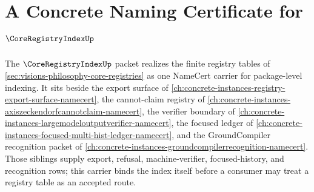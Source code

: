 \chapter{A Concrete Naming Certificate for $\CoreRegistryIndexUp$}
\label{ch:concrete-instances-core-registry-index-namecert}

The $\CoreRegistryIndexUp$ packet realizes the finite registry tables of \autoref{sec:visions-philosophy-core-registries} as one NameCert carrier for package-level indexing. It sits beside the export surface of \autoref{ch:concrete-instances-registry-export-surface-namecert}, the cannot-claim registry of \autoref{ch:concrete-instances-axiszeckendorfcannotclaim-namecert}, the verifier boundary of \autoref{ch:concrete-instances-largemodeloutputverifier-namecert}, the focused ledger of \autoref{ch:concrete-instances-focused-multi-hist-ledger-namecert}, and the GroundCompiler recognition packet of \autoref{ch:concrete-instances-groundcompilerrecognition-namecert}. Those siblings supply export, refusal, machine-verifier, focused-history, and recognition rows; this carrier binds the index itself before a consumer may treat a registry table as an accepted route.

